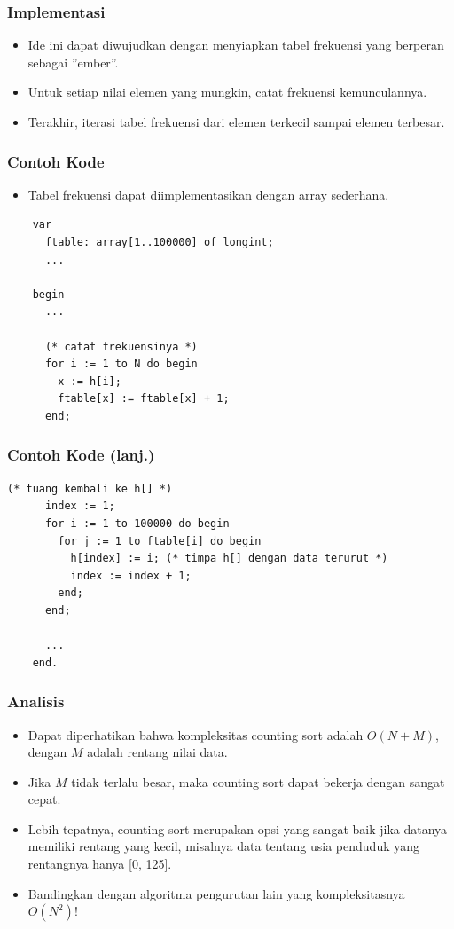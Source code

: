 \begin{frame}
\frametitle{Implementasi}
  \begin{itemize}
    \item Ide ini dapat diwujudkan dengan menyiapkan tabel frekuensi yang berperan sebagai ”ember”.
    \item Untuk setiap nilai elemen yang mungkin, catat frekuensi kemunculannya.
    \item Terakhir, iterasi tabel frekuensi dari elemen terkecil sampai elemen terbesar.
  \end{itemize}
\end{frame}

\begin{frame}[fragile]
\frametitle{Contoh Kode}
  \begin{itemize}
    \item Tabel frekuensi dapat diimplementasikan dengan array
    sederhana.
  \end{itemize}
  \begin{lstlisting}
    var
      ftable: array[1..100000] of longint;
      ...
    
    begin
      ...
    
      (* catat frekuensinya *)
      for i := 1 to N do begin
        x := h[i];
        ftable[x] := ftable[x] + 1;
      end;
  \end{lstlisting}
\end{frame}

\begin{frame}[fragile]
\frametitle{Contoh Kode (lanj.)}
  \begin{lstlisting}[gobble=4]
      (* tuang kembali ke h[] *)
      index := 1;
      for i := 1 to 100000 do begin
        for j := 1 to ftable[i] do begin
          h[index] := i; (* timpa h[] dengan data terurut *)
          index := index + 1;
        end;
      end;
    
      ...
    end.
  \end{lstlisting}
\end{frame}

\begin{frame}
\frametitle{Analisis}
  \begin{itemize}
    \item Dapat diperhatikan bahwa kompleksitas counting sort adalah $O(N + M)$, dengan $M$ adalah rentang nilai data.
    \item Jika $M$ tidak terlalu besar, maka counting sort dapat bekerja dengan sangat cepat.
    \item Lebih tepatnya, counting sort merupakan opsi yang sangat baik jika datanya memiliki rentang yang kecil, misalnya data tentang usia penduduk yang rentangnya hanya [0, 125].
    \item Bandingkan dengan algoritma pengurutan lain yang kompleksitasnya $O(N^2)$!
  \end{itemize}
\end{frame}

